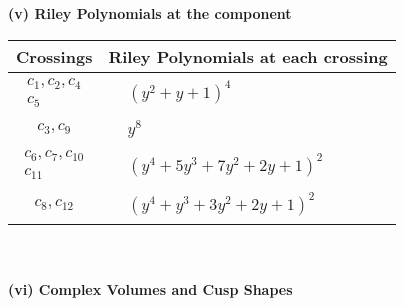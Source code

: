 \documentclass[1p]{elsarticle_modified}
\theoremstyle{definition}
\begin{document}
\newpage\renewcommand{\arraystretch}{1}
\flushleft \textbf{(v) Riley Polynomials at the component}\newline \\
\begin{tabular}{m{50pt}|m{274pt}}
Crossings & \hspace{64pt}Riley Polynomials at each crossing \\
\hline $$\begin{aligned}c_{1},c_{2},c_{4}\\c_{5}\end{aligned}$$&$\begin{aligned}
&(y^2+y+1)^4
\end{aligned}$\\
\hline $$\begin{aligned}c_{3},c_{9}\end{aligned}$$&$\begin{aligned}
&y^8
\end{aligned}$\\
\hline $$\begin{aligned}c_{6},c_{7},c_{10}\\c_{11}\end{aligned}$$&$\begin{aligned}
&(y^4+5 y^3+7 y^2+2 y+1)^2
\end{aligned}$\\
\hline $$\begin{aligned}c_{8},c_{12}\end{aligned}$$&$\begin{aligned}
&(y^4+y^3+3 y^2+2 y+1)^2
\end{aligned}$\\
\hline
\end{tabular}\\~\\
\newpage\flushleft \textbf{(vi) Complex Volumes and Cusp Shapes}
\end{document}
